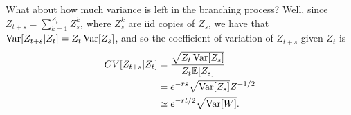\documentclass{article}
\begin{document}
What about how much variance is left in the branching process?
Well, since $Z_{t+s} = \sum_{k=1}^{Z_t} Z^k_{s}$, where $Z^k_s$ are iid copies of $Z_s$,
we have that $\mathop{\mbox{Var}}[Z_{t+s}|Z_t] = Z_t \mathop{\mbox{Var}}[Z_s]$,
and so the coefficient of variation of $Z_{t+s}$ given $Z_t$ is
\begin{align}
   \mathop{CV}[Z_{t+s}|Z_t] &= \frac{\sqrt{Z_t \mathop{\mbox{Var}}[Z_s]}}{ Z_t \mathbb{E}[Z_s] } \\
        &= e^{-rs} \sqrt{ \mathop{\mbox{Var}}[Z_s] } Z^{-1/2} \\
        &\simeq e^{-rt/2} \sqrt{ \mathop{\mbox{Var}}[W] } .
\end{align}
\end{document}
